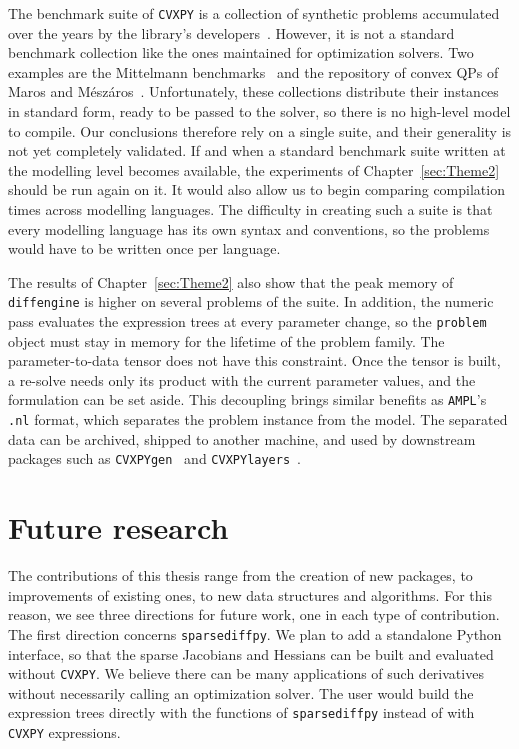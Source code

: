 The benchmark suite of \texttt{CVXPY} is a collection of synthetic problems accumulated over
the years by the library's developers~\cite{cvxpybenchmarks}. However, it is not a standard
benchmark collection like the ones maintained for optimization solvers. Two examples are the
Mittelmann benchmarks~\cite{mittelmann2020benchmarking} and the repository of convex
\acp{QP} of Maros and M\'esz\'aros~\cite{maros1999repository}. Unfortunately, these
collections distribute their
instances in standard form, ready to be passed to the solver, so there is no high-level
model to compile. Our conclusions therefore rely on a single suite, and their generality is
not yet completely validated. If and when a standard benchmark suite written at the
modelling level becomes available, the experiments of Chapter~\ref{sec:Theme2} should be
run again on it.
It would also allow us to begin comparing compilation times across modelling languages.
The difficulty in creating such a suite is that every modelling language has its own syntax
and conventions, so the problems would have to be written once per language.

The results of Chapter~\ref{sec:Theme2} also show that the peak memory of
\texttt{diffengine} is higher on several problems of the suite. In addition, the
numeric pass evaluates the expression trees at every parameter change, so the \texttt{problem} object must stay in memory for the lifetime of the problem
family. The parameter-to-data tensor does not have this constraint. Once the tensor is
built, a re-solve needs only its product with the current parameter values, and the
formulation can be set aside. This decoupling brings similar benefits as \texttt{AMPL}'s
\texttt{.nl} format, which separates the problem instance from the model.
The separated data can be archived, shipped to another machine, and used by downstream packages
such as \texttt{CVXPYgen}~\cite{schaller2022cvxpygen} and \texttt{CVXPYlayers}~\cite{agrawal2019dpp}.

\section{Future research}\label{sec:FutureResearch}

The contributions of this thesis range from the creation of new packages, to improvements
of existing ones, to new data structures and algorithms. For this reason, we see three
directions for future work, one in each type of contribution.
The first direction concerns \texttt{sparsediffpy}. We plan to add a standalone
Python interface, so that the sparse Jacobians and Hessians can be built and evaluated
without \texttt{CVXPY}. We believe there can be many applications of such derivatives without
necessarily calling an optimization solver. The user would build the expression trees directly with
the functions of \texttt{sparsediffpy} instead of with \texttt{CVXPY} expressions.

